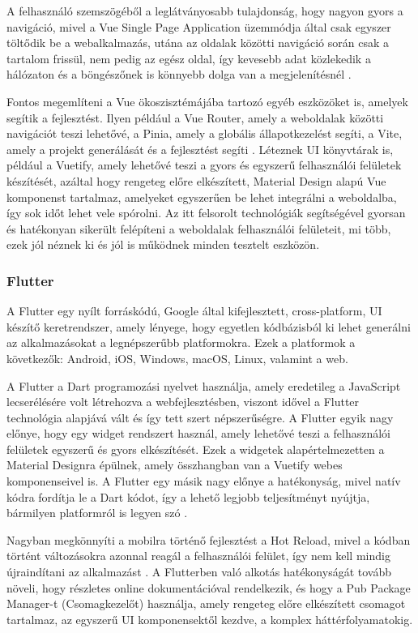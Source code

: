A felhasználó szemszögéből a leglátványosabb tulajdonság, hogy nagyon gyors a navigáció, mivel a Vue Single Page Application üzemmódja által csak egyszer töltődik be a webalkalmazás, utána az oldalak közötti navigáció során csak a tartalom frissül, nem pedig az egész oldal, így kevesebb adat közlekedik a hálózaton és a böngészőnek is könnyebb dolga van a megjelenítésnél \cite{vue3}.

Fontos megemlíteni a Vue ökoszisztémájába tartozó egyéb eszközöket is, amelyek segítik a fejlesztést. Ilyen például a Vue Router, amely a weboldalak közötti navigációt teszi lehetővé, a Pinia, amely a globális állapotkezelést segíti, a Vite, amely a projekt generálását és a fejlesztést segíti \cite{vue3}. Léteznek UI könyvtárak is, például a Vuetify, amely lehetővé teszi a gyors és egyszerű felhasználói felületek készítését, azáltal hogy rengeteg előre elkészített, Material Design alapú Vue komponenst tartalmaz, amelyeket egyszerűen be lehet integrálni a weboldalba, így sok időt lehet vele spórolni. Az itt felsorolt technológiák segítségével gyorsan és hatékonyan sikerült felépíteni a weboldalak felhasználói felületeit, mi több, ezek jól néznek ki és jól is működnek minden tesztelt eszközön.

\subsubsection{Flutter}
A Flutter egy nyílt forráskódú, Google által kifejlesztett, cross-platform, UI készítő keretrendszer, amely lényege, hogy egyetlen kódbázisból ki lehet generálni az alkalmazásokat a legnépszerűbb platformokra. Ezek a platformok a következők: Android, iOS, Windows, macOS, Linux, valamint a web.

A Flutter a Dart programozási nyelvet használja, amely eredetileg a JavaScript lecserélésére volt létrehozva a webfejlesztésben, viszont idővel a Flutter technológia alapjává vált és így tett szert népszerűségre. A Flutter egyik nagy előnye, hogy egy widget rendszert használ, amely lehetővé teszi a felhasználói felületek egyszerű és gyors elkészítését. Ezek a widgetek alapértelmezetten a Material Designra épülnek, amely összhangban van a Vuetify webes komponenseivel is. A Flutter egy másik nagy előnye a hatékonyság, mivel natív kódra fordítja le a Dart kódot, így a lehető legjobb teljesítményt nyújtja, bármilyen platformról is legyen szó \cite{flutterinaction}.

Nagyban megkönnyíti a mobilra történő fejlesztést a Hot Reload, mivel a kódban történt változásokra azonnal reagál a felhasználói felület, így nem kell mindig újraindítani az alkalmazást \cite{flutterinaction}. A Flutterben való alkotás hatékonyságát tovább növeli, hogy részletes online dokumentációval rendelkezik, és hogy a Pub Package Manager-t (Csomagkezelőt) használja, amely rengeteg előre elkészített csomagot tartalmaz, az egyszerű UI komponensektől kezdve, a komplex háttérfolyamatokig.

